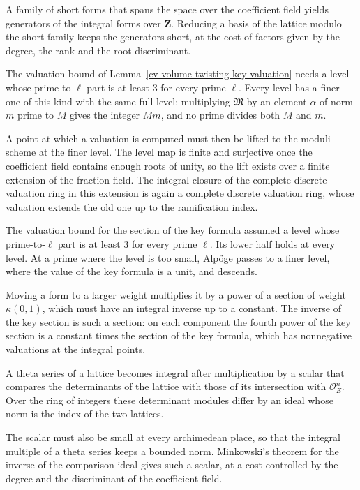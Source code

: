 A family of short forms that spans the space over the coefficient field yields generators of the integral
forms over $\mathbf Z$. Reducing a basis of the lattice modulo the short family keeps the generators short,
at the cost of factors given by the degree, the rank and the root discriminant.

The valuation bound of Lemma~\ref{cv-volume-twisting-key-valuation} needs a level whose prime-to-$\ell$ part is at least
$3$ for every prime $\ell$. Every level has a finer one of this kind with the same full level: multiplying
$\mathfrak M$ by an element $\alpha$ of norm $m$ prime to $M$ gives the integer $Mm$, and no prime divides both $M$
and $m$.

A point at which a valuation is computed must then be lifted to the moduli scheme at the finer level. The level map is
finite and surjective once the coefficient field contains enough roots of unity, so the lift exists over a finite
extension of the fraction field. The integral closure of the complete discrete valuation ring in this extension is
again a complete discrete valuation ring, whose valuation extends the old one up to the ramification index.

The valuation bound for the section of the key formula assumed a level whose prime-to-$\ell$ part is at least
$3$ for every prime $\ell$. Its lower half holds at every level. At a prime where the level is too small,
Alp\"oge passes to a finer level, where the value of the key formula is a unit, and descends.

Moving a form to a larger weight multiplies it by a power of a section of weight $\kappa(0,1)$, which must
have an integral inverse up to a constant. The inverse of the key section is such a section: on each
component the fourth power of the key section is a constant times the section of the key formula, which has
nonnegative valuations at the integral points.

A theta series of a lattice becomes integral after multiplication by a scalar that compares the determinants
of the lattice with those of its intersection with $\mathcal O_E^n$. Over the ring of integers these
determinant modules differ by an ideal whose norm is the index of the two lattices.

The scalar must also be small at every archimedean place, so that the integral multiple of a theta series
keeps a bounded norm. Minkowski's theorem for the inverse of the comparison ideal gives such a scalar, at a
cost controlled by the degree and the discriminant of the coefficient field.

